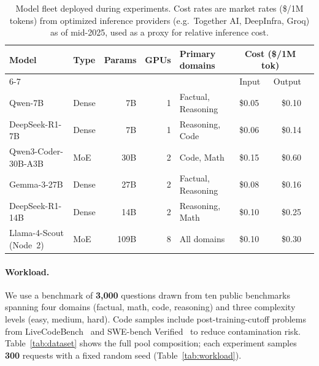 \documentclass[11pt]{article}
\newcommand{\result}[1]{\textbf{#1}}
\begin{document}
\begin{table}[t]
  \centering
  \caption{%
    Model fleet deployed during experiments.
    Cost rates are market rates (\$/1M tokens) from optimized inference
    providers (e.g.\ Together AI, DeepInfra, Groq) as of mid-2025,
    used as a proxy for relative inference cost.%
  }
  \label{tab:models}
  \small
  \setlength{\tabcolsep}{4pt}
  \begin{tabular}{llrrllrr}
    \toprule
    Model & Type & Params & GPUs & Primary domains
          & \multicolumn{2}{c}{Cost (\$/1M tok)} \\
    \cmidrule(lr){6-7}
    & & & & & Input & Output \\
    \midrule
    Qwen-7B             & Dense & 7B   & 1 & Factual, Reasoning & \$0.05 & \$0.10 \\
    DeepSeek-R1-7B      & Dense & 7B   & 1 & Reasoning, Code    & \$0.06 & \$0.14 \\
    Qwen3-Coder-30B-A3B & MoE   & 30B  & 2 & Code, Math         & \$0.15 & \$0.60 \\
    Gemma-3-27B         & Dense & 27B  & 2 & Factual, Reasoning & \$0.08 & \$0.16 \\
    DeepSeek-R1-14B     & Dense & 14B  & 2 & Reasoning, Math    & \$0.10 & \$0.25 \\
    \midrule
    Llama-4-Scout (Node~2) & MoE & 109B & 8 & All domains       & \$0.10 & \$0.30 \\
    \bottomrule
  \end{tabular}
\end{table}

\paragraph{Workload.}
We use a benchmark of \result{3{,}000} questions drawn from ten public benchmarks
spanning four domains (factual, math, code, reasoning)
and three complexity levels (easy, medium, hard).
Code samples include post-training-cutoff problems from
LiveCodeBench~\cite{jain2024livecodebench} and
SWE-bench Verified~\cite{jimenez2024swebench}
to reduce contamination risk.
Table~\ref{tab:dataset} shows the full pool composition;
each experiment samples \result{300} requests with a fixed random seed (Table~\ref{tab:workload}).
\end{document}
